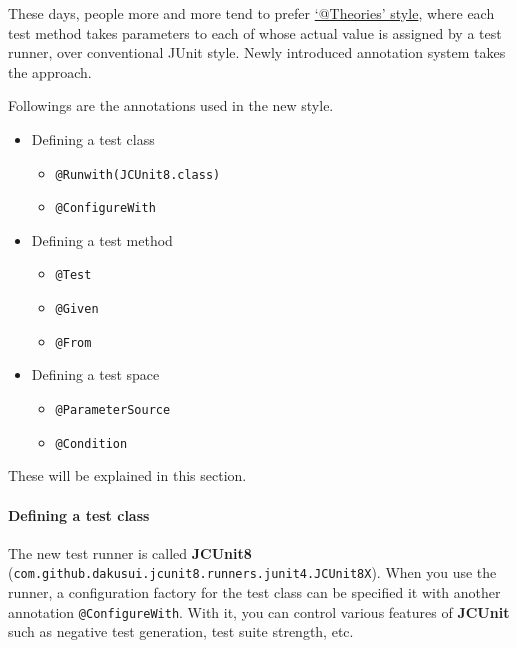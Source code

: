 These days, people more and more tend to prefer
\href{http://junit.org/junit4/javadoc/4.12/org/junit/experimental/theories/Theories.html}{`@Theories'
style}, where each test method takes parameters to each of whose actual
value is assigned by a test runner, over conventional JUnit style. Newly
introduced annotation system takes the approach.

Followings are the annotations used in the new style.

\begin{itemize}
\tightlist
\item
  Defining a test class

  \begin{itemize}
  \tightlist
  \item
    \texttt{@Runwith(JCUnit8.class)}
  \item
    \texttt{@ConfigureWith}
  \end{itemize}
\item
  Defining a test method

  \begin{itemize}
  \tightlist
  \item
    \texttt{@Test}
  \item
    \texttt{@Given}
  \item
    \texttt{@From}
  \end{itemize}
\item
  Defining a test space

  \begin{itemize}
  \tightlist
  \item
    \texttt{@ParameterSource}
  \item
    \texttt{@Condition}
  \end{itemize}
\end{itemize}

These will be explained in this section.

\paragraph{Defining a test class}\label{defining-a-test-class}

The new test runner is called \textbf{JCUnit8}
(\texttt{com.github.dakusui.jcunit8.runners.junit4.JCUnit8X}). When you
use the runner, a configuration factory for the test class can be
specified it with another annotation \texttt{@ConfigureWith}. With it,
you can control various features of \textbf{JCUnit} such as negative
test generation, test suite strength, etc.

